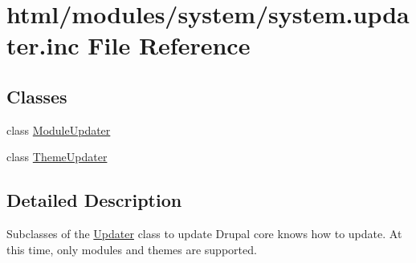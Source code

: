 \hypertarget{system_8updater_8inc}{
\section{html/modules/system/system.updater.inc File Reference}
\label{system_8updater_8inc}
}
\subsection*{Classes}
\begin{DoxyCompactItemize}
\item 
class \hyperlink{classModuleUpdater}{ModuleUpdater}
\item 
class \hyperlink{classThemeUpdater}{ThemeUpdater}
\end{DoxyCompactItemize}


\subsection{Detailed Description}
Subclasses of the \hyperlink{classUpdater}{Updater} class to update Drupal core knows how to update. At this time, only modules and themes are supported. 